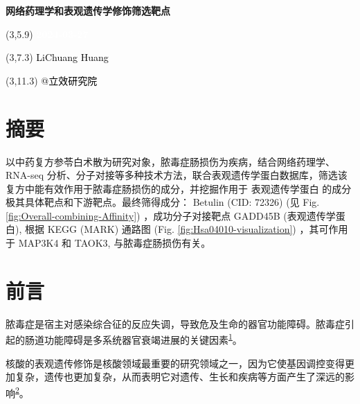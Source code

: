 \documentclass[
]{article}
\author{}
\date{\vspace{-2.5em}}
\begin{document}
\begin{titlepage} 
\begin{center} \textbf{\Huge
网络药理学和表观遗传学修饰筛选靶点} \vspace{4em}
\begin{textblock}{10}(3,5.9) \huge
\textbf{\textcolor{white}{2024-03-27}}
\end{textblock} \begin{textblock}{10}(3,7.3)
\Large \textcolor{black}{LiChuang Huang}
\end{textblock} \begin{textblock}{10}(3,11.3)
\Large \textcolor{black}{@立效研究院}
\end{textblock} \end{center} \end{titlepage}
\restoregeometry


\tableofcontents

\listoffigures

\listoftables

\newpage


\hypertarget{abstract}{%
\section{摘要}\label{abstract}}

以中药复方参苓白术散为研究对象，脓毒症肠损伤为疾病，结合网络药理学、RNA-seq 分析、分子对接等多种技术方法，联合表观遗传学蛋白数据库，筛选该复方中能有效作用于脓毒症肠损伤的成分，并挖掘作用于 表观遗传学蛋白 的成分极其具体靶点和下游靶点。最终筛得成分： Betulin (CID: 72326) (见 Fig. \ref{fig:Overall-combining-Affinity}) ，成功分子对接靶点 GADD45B (表观遗传学蛋白),
根据 KEGG (MARK) 通路图 (Fig. \ref{fig:Hsa04010-visualization}) ，其可作用于 MAP3K4 和 TAOK3, 与脓毒症肠损伤有关。

\hypertarget{introduction}{%
\section{前言}\label{introduction}}

脓毒症是宿主对感染综合征的反应失调，导致危及生命的器官功能障碍。脓毒症引起的肠道功能障碍是多系统器官衰竭进展的关键因素\textsuperscript{\protect\hyperlink{ref-TargetingStingKobrit2023}{1}}。

核酸的表观遗传修饰是核酸领域最重要的研究领域之一，因为它使基因调控变得更加复杂，遗传也更加复杂，从而表明它对遗传、生长和疾病等方面产生了深远的影响\textsuperscript{\protect\hyperlink{ref-EpigeneticModiChen2017}{2}}。
\end{document}
